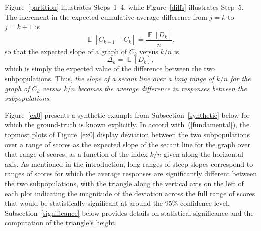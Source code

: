 \documentclass{article}
\DeclareMathOperator{\E}{\mathop{}\mathbb{E}}
\begin{document}
Figure~\ref{partition} illustrates Steps~1--4,
while Figure~\ref{diffs} illustrates Step~5.
The increment in the expected cumulative average difference
from $j = k$ to $j = k+1$ is
%
\begin{equation}
\label{fundamental}
\E[ C_{k+1} - C_k ] = \frac{\E[D_k]}{n},
\end{equation}
%
so that the expected slope of a graph of $C_k$ versus $k/n$ is
%
\begin{equation}
\label{delta}
\Delta_k = \E[D_k],
\end{equation}
%
which is simply the expected value of the difference
between the two subpopulations.
Thus, {\it the slope of a secant line over a long range of $k/n$
for the graph of $C_k$ versus $k/n$ becomes the average difference
in responses between the subpopulations}.

Figure~\ref{ex0} presents a synthetic example
from Subsection~\ref{synthetic} below for which the ground-truth
is known explicitly.
In accord with~(\ref{fundamental}),
the topmost plots of Figure~\ref{ex0}
display deviation between the two subpopulations over a range of scores
as the expected slope of the secant line for the graph
over that range of scores, as a function of the index $k/n$
given along the horizontal axis.
As mentioned in the introduction,
long ranges of steep slopes correspond to ranges of scores for which
the average responses are significantly different
between the two subpopulations,
with the triangle along the vertical axis on the left of each plot
indicating the magnitude of the deviation across the full range of scores
that would be statistically significant at around the 95\% confidence level.
Subsection~\ref{significance} below provides details
on statistical significance and the computation of the triangle's height.
\end{document}
